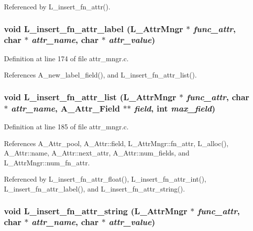 Referenced by L\_\-insert\_\-fn\_\-attr().
\subsubsection{\setlength{\rightskip}{0pt plus 5cm}void L\_\-insert\_\-fn\_\-attr\_\-label (\bf{L\_\-Attr\-Mngr} $\ast$ {\em func\_\-attr}, char $\ast$ {\em attr\_\-name}, char $\ast$ {\em attr\_\-value})}\label{attr__mngr_8h_d6c0e3a59b2815143141579ab8362d41}




Definition at line 174 of file attr\_\-mngr.c.

References A\_\-new\_\-label\_\-field(), and L\_\-insert\_\-fn\_\-attr\_\-list().
\subsubsection{\setlength{\rightskip}{0pt plus 5cm}void L\_\-insert\_\-fn\_\-attr\_\-list (\bf{L\_\-Attr\-Mngr} $\ast$ {\em func\_\-attr}, char $\ast$ {\em attr\_\-name}, \bf{A\_\-Attr\_\-Field} $\ast$$\ast$ {\em field}, int {\em max\_\-field})}\label{attr__mngr_8h_939415af42eac998921ea7c61b19da33}




Definition at line 185 of file attr\_\-mngr.c.

References A\_\-Attr\_\-pool, A\_\-Attr::field, L\_\-Attr\-Mngr::fn\_\-attr, L\_\-alloc(), A\_\-Attr::name, A\_\-Attr::next\_\-attr, A\_\-Attr::num\_\-fields, and L\_\-Attr\-Mngr::num\_\-fn\_\-attr.

Referenced by L\_\-insert\_\-fn\_\-attr\_\-float(), L\_\-insert\_\-fn\_\-attr\_\-int(), L\_\-insert\_\-fn\_\-attr\_\-label(), and L\_\-insert\_\-fn\_\-attr\_\-string().
\subsubsection{\setlength{\rightskip}{0pt plus 5cm}void L\_\-insert\_\-fn\_\-attr\_\-string (\bf{L\_\-Attr\-Mngr} $\ast$ {\em func\_\-attr}, char $\ast$ {\em attr\_\-name}, char $\ast$ {\em attr\_\-value})}\label{attr__mngr_8h_205db31c2aaf8c8e935269742706f301}




